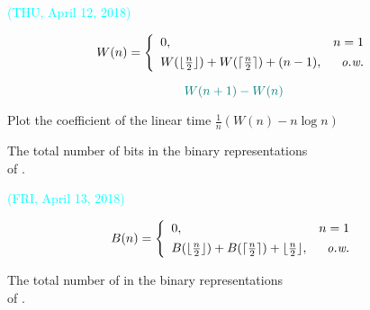 \begin{frame}{}
  {\vspace{-0.50cm} \centerline{\textcolor{cyan}{\small (THU, April 12, 2018)}}}

  \vspace{0.30cm}
  \[
    W(n) = \left\{\begin{array}{lr}
      0,	& n = 1 \\[4pt]
      W(\lfloor \frac{n}{2} \rfloor) + W(\lceil \frac{n}{2} \rceil) + (n - 1), & \text{\it o.w.}
    \end{array}\right.
  \]

  \vspace{0.30cm}
  \[
    \textcolor{teal}{W(n+1) - W(n)}
  \]

  \vspace{0.10cm}
  \centerline{Plot the coefficient of the linear time $\frac{1}{n}(W(n) - n \log n)$}

  \vspace{0.10cm}
  \begin{center}
    {\large {The total number of bits in the binary representations \\ of .}}
  \end{center}
\end{frame}

\begin{frame}{}
  {\vspace{-0.50cm} \centerline{\textcolor{cyan}{\small (FRI, April 13, 2018)}}}

  \vspace{0.30cm}
  \[
    B(n) = \left\{\begin{array}{lr}
      0,	& n = 1 \\[4pt]
      B(\lfloor \frac{n}{2} \rfloor) + B(\lceil \frac{n}{2} \rceil) + \lfloor \frac{n}{2} \rfloor, & \text{\it o.w.}
    \end{array}\right.
  \]

  \vspace{0.30cm}
  \begin{center}
    {\large {The total number of  in the binary representations \\ of .}}
  \end{center}
\end{frame}

